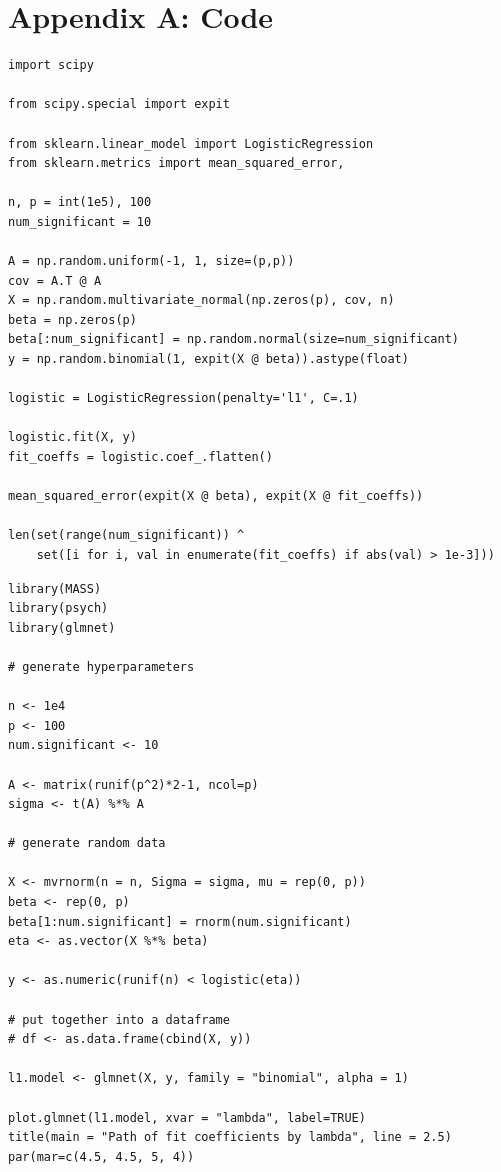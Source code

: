 \documentclass[letterpaper, 12pt]{article}
\begin{document}
\newpage

\section*{Appendix A: Code}

\begin{lstlisting}
import scipy

from scipy.special import expit

from sklearn.linear_model import LogisticRegression
from sklearn.metrics import mean_squared_error, 

n, p = int(1e5), 100
num_significant = 10

A = np.random.uniform(-1, 1, size=(p,p))
cov = A.T @ A
X = np.random.multivariate_normal(np.zeros(p), cov, n)
beta = np.zeros(p)
beta[:num_significant] = np.random.normal(size=num_significant)
y = np.random.binomial(1, expit(X @ beta)).astype(float)

logistic = LogisticRegression(penalty='l1', C=.1)

logistic.fit(X, y)
fit_coeffs = logistic.coef_.flatten()

mean_squared_error(expit(X @ beta), expit(X @ fit_coeffs))

len(set(range(num_significant)) ^ 
    set([i for i, val in enumerate(fit_coeffs) if abs(val) > 1e-3]))
\end{lstlisting}

\begin{lstlisting}
library(MASS)
library(psych)
library(glmnet)

# generate hyperparameters

n <- 1e4
p <- 100
num.significant <- 10

A <- matrix(runif(p^2)*2-1, ncol=p) 
sigma <- t(A) %*% A

# generate random data

X <- mvrnorm(n = n, Sigma = sigma, mu = rep(0, p))
beta <- rep(0, p)
beta[1:num.significant] = rnorm(num.significant)
eta <- as.vector(X %*% beta)

y <- as.numeric(runif(n) < logistic(eta))

# put together into a dataframe
# df <- as.data.frame(cbind(X, y))

l1.model <- glmnet(X, y, family = "binomial", alpha = 1)

plot.glmnet(l1.model, xvar = "lambda", label=TRUE)
title(main = "Path of fit coefficients by lambda", line = 2.5)
par(mar=c(4.5, 4.5, 5, 4))
\end{lstlisting}
\end{document}
